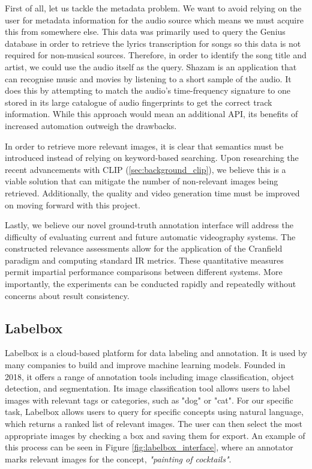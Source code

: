 \documentclass{l4proj}
\begin{document}
First of all, let us tackle the metadata problem. We want to avoid relying on the user for metadata information for the audio source which means we must acquire this from somewhere else. This data was primarily used to query the Genius database in order to retrieve the lyrics transcription for songs so this data is not required for non-musical sources. Therefore, in order to identify the song title and artist, we could use the audio itself as the query. Shazam \citep{wang2006shazam} is an application that can recognise music and movies by listening to a short sample of the audio. It does this by attempting to match the audio's time-frequency signature to one stored in its large catalogue of audio fingerprints to get the correct track information. While this approach would mean an additional API, its benefits of increased automation outweigh the drawbacks.

In order to retrieve more relevant images, it is clear that semantics must be introduced instead of relying on keyword-based searching. Upon researching the recent advancements with CLIP (\ref{sec:background_clip}), we believe this is a viable solution that can mitigate the number of non-relevant images being retrieved. Additionally, the quality and video generation time must be improved on moving forward with this project.

Lastly, we believe our novel ground-truth annotation interface will address the difficulty of evaluating current and future automatic videography systems. The constructed relevance assessments allow for the application of the Cranfield paradigm and computing standard IR metrics. These quantitative measures permit impartial performance comparisons between different systems. More importantly, the experiments can be conducted rapidly and repeatedly without concerns about result consistency.


\subsection{Labelbox}
\label{sec:labelbox}
Labelbox is a cloud-based platform for data labeling and annotation. It is used by many companies to build and improve machine learning models. Founded in 2018, it offers a range of annotation tools including image classification, object detection, and segmentation. Its image classification tool allows users to label images with relevant tags or categories, such as "dog" or "cat". For our specific task, Labelbox allows users to query for specific concepts using natural language, which returns a ranked list of relevant images. The user can then select the most appropriate images by checking a box and saving them for export. An example of this process can be seen in Figure \ref{fig:labelbox_interface}, where an annotator marks relevant images for the concept, \emph{"painting of cocktails"}.
\end{document}

